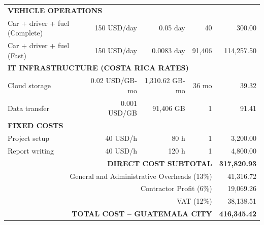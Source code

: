 \begin{longtable}{lrrrr}
\multicolumn{5}{l}{\textbf{VEHICLE OPERATIONS}} \\

Car + driver + fuel (Complete) & 150 USD/day & 0.05 day & 40 & 300.00 \\
Car + driver + fuel (Fast) & 150 USD/day & 0.0083 day & 91,406 & 114,257.50 \\
\hline

\multicolumn{5}{l}{\textbf{IT INFRASTRUCTURE (COSTA RICA RATES)}} \\

Cloud storage & 0.02 USD/GB-mo & 1,310.62 GB-mo & 36 mo & 39.32 \\
Data transfer & 0.001 USD/GB & 91,406 GB & 1 & 91.41 \\
\hline

\multicolumn{5}{l}{\textbf{FIXED COSTS}} \\

Project setup & 40 USD/h & 80 h & 1 & 3,200.00 \\
Report writing & 40 USD/h & 120 h & 1 & 4,800.00 \\
\hline

\multicolumn{4}{r}{\textbf{DIRECT COST SUBTOTAL}} & \textbf{317,820.93} \\
\hline

\multicolumn{4}{r}{General and Administrative Overheads (13\%)} & 41,316.72 \\
\multicolumn{4}{r}{Contractor Profit (6\%)} & 19,069.26 \\
\multicolumn{4}{r}{VAT (12\%)} & 38,138.51 \\
\hline

\multicolumn{4}{r}{\textbf{TOTAL COST – GUATEMALA CITY}} & \textbf{416,345.42} \\
\hline

\end{longtable}

















